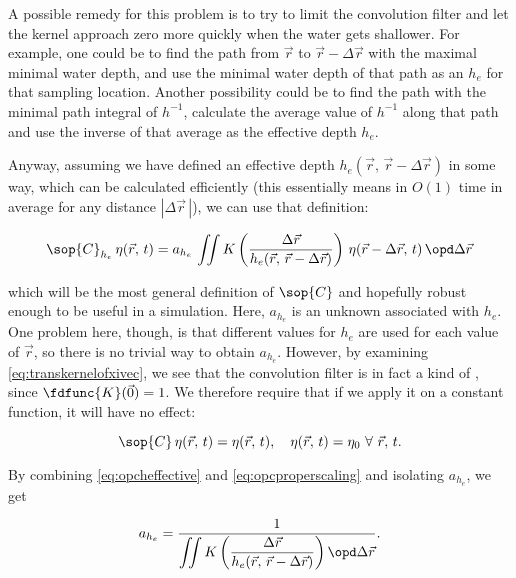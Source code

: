 A possible remedy for this problem is to try to limit the convolution filter and let the kernel approach zero more quickly when the water gets shallower. For example, one could be to find the path from $\vec{r}$ to $\vec{r}-\Delta\vec{r}$ with the maximal minimal water depth, and use the minimal water depth of that path as an  $h_e$ for that sampling location. Another possibility could be to find the path with the minimal path integral of $h^{-1}$, calculate the average value of $h^{-1}$ along that path and use the inverse of that average as the effective depth $h_e$.


Anyway, assuming we have defined an effective depth \mbox{$h_e(\vec{r},\,\vec{r}-\Delta\vec{r})$} in some way, which can be calculated efficiently (this essentially means in $O(1)$ time in average for any distance $|\Delta\vec{r}\,|$), we can use that definition:

\begin{equation} \label{eq:opcheffective}
\sop{C}_{h_e}\,\eta(\vec{r},\,t) = a_{h_e}\,\iint K\left(\frac{\Delta\vec{r}}{h_e(\vec{r},\,\vec{r}-\Delta\vec{r})}\right)\,\eta(\vec{r}-\Delta\vec{r},\,t)\,\opd\Delta\vec{r}
\end{equation}

which will be the most general definition of $\sop{C}$ and hopefully robust enough to be useful in a simulation. Here, $a_{h_e}$ is an unknown  associated with $h_e$. One problem here, though, is that different values for $h_e$ are used for each value of $\vec{r}$, so there is no trivial way to obtain $a_{h_e}$. However, by examining \eqref{eq:transkernelofxivec}, we see that the convolution filter is in fact a kind of , since $\fdfunc{K}(\vec{0}) = 1$. We therefore require that if we apply it on a constant function, it will have no effect:

\begin{equation} \label{eq:opcproperscaling}
\sop{C}\,\eta(\vec{r},\,t) = \eta(\vec{r},\,t),\quad\eta(\vec{r},\,t) = \eta_0\ \forall\ \vec{r},\,t.
\end{equation}

By combining \eqref{eq:opcheffective} and \eqref{eq:opcproperscaling} and isolating $a_{h_e}$, we get

\begin{equation} \label{eq:scalingheffective}
a_{h_e} = \frac{1}{\displaystyle\iint K\left(\frac{\Delta\vec{r}}{h_e(\vec{r},\,\vec{r}-\Delta\vec{r})}\right) \opd\Delta\vec{r}}.
\end{equation}

